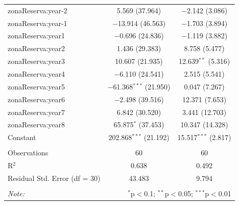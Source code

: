 \documentclass[utf8]{frontiers_suppmat} %
\begin{document}
\begin{table}[!htbp]
\begin{tabular}{@{\extracolsep{1pt}}lcc}
  zonaReserva:year-2 & 5.569 (37.964) & $-$2.142 (3.086) \\ 
  zonaReserva:year-1 & $-$13.914 (46.563) & $-$1.703 (3.894) \\ 
  zonaReserva:year1 & $-$0.696 (24.836) & $-$1.119 (3.882) \\ 
  zonaReserva:year2 & 1.436 (29.383) & 8.758 (5.477) \\ 
  zonaReserva:year3 & 10.607 (21.935) & 12.639$^{**}$ (5.316) \\ 
  zonaReserva:year4 & $-$6.110 (24.541) & 2.515 (5.541) \\ 
  zonaReserva:year5 & $-$61.368$^{***}$ (21.950) & 0.047 (7.267) \\ 
  zonaReserva:year6 & $-$2.498 (39.516) & 12.371 (7.653) \\ 
  zonaReserva:year7 & 6.842 (30.520) & 3.441 (12.703) \\ 
  zonaReserva:year8 & 65.875$^{*}$ (37.453) & 10.347 (14.328) \\ 
  Constant & 202.868$^{***}$ (21.192) & 15.517$^{***}$ (2.817) \\ 
 \hline \\[-1.8ex] 
Observations & 60 & 60 \\ 
R$^{2}$ & 0.638 & 0.492 \\ 
Residual Std. Error (df = 30) & 43.483 & 9.794 \\ 
\hline 
\hline \\[-1.8ex] 
\textit{Note:}  & \multicolumn{2}{r}{$^{*}$p$<$0.1; $^{**}$p$<$0.05; $^{***}$p$<$0.01} \\ 
\end{tabular} 
\end{table}

\clearpage
\end{document}
